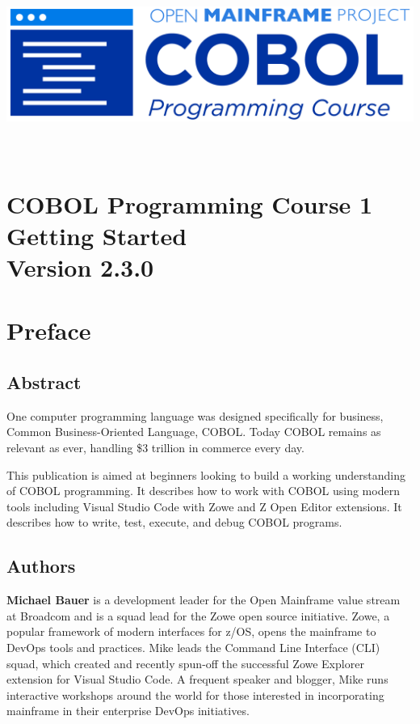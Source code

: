 \begin{center}
  \vspace*{25pt}
\includegraphics{Images/COBOL-Programming-Course.png}
\hypertarget{cobol-programming-course-1}{%
\section*{
  \\[35pt]
  \Huge COBOL Programming Course 1 \\[10pt]
  \Huge Getting Started \\[15pt]
  \Large Version 2.3.0}\label{cobol-programming-course-1}}
\end{center}

\pagebreak

\hypertarget{preface}{%
\section*{Preface}\label{preface}}

\hypertarget{abstract}{%
\subsection*{Abstract}\label{abstract}}

One computer programming language was designed specifically for
business, Common Business-Oriented Language, COBOL. Today COBOL remains
as relevant as ever, handling \$3 trillion in commerce every day.

This publication is aimed at beginners looking to build a working
understanding of COBOL programming. It describes how to work with COBOL
using modern tools including Visual Studio Code with Zowe and Z Open
Editor extensions. It describes how to write, test, execute, and debug
COBOL programs.

\hypertarget{authors}{%
\subsection*{Authors}\label{authors}}

\textbf{Michael Bauer} is a development leader for the Open Mainframe
value stream at Broadcom and is a squad lead for the Zowe open source
initiative. Zowe, a popular framework of modern interfaces for z/OS,
opens the mainframe to DevOps tools and practices.  Mike leads the
Command Line Interface (CLI) squad, which created and recently spun-off
the successful Zowe Explorer extension for Visual Studio Code. A
frequent speaker and blogger, Mike runs interactive workshops around the
world for those interested in incorporating mainframe in their
enterprise DevOps initiatives.

